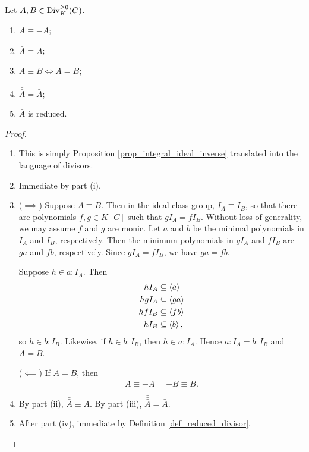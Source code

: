 \begin{proposition}
  \label{prop_flip_properties}
  Let $A, B \in \operatorname{Div}_K^{\geq 0}(C)$.
  \begin{enumerate}[label=(\roman*)]
    \item $\bar A \equiv -A$;
    \item $\bar{\bar A} \equiv A$;
    \item $A \equiv B \iff \bar A = \bar B$;
    \item $\bar{\bar{\bar A}} = \bar A$;
    \item $\bar A$ is reduced.
  \end{enumerate}
\end{proposition}
\begin{proof}
  \begin{enumerate}[label=(\roman*)]
    \item This is simply Proposition \ref{prop_integral_ideal_inverse} translated into the language of divisors.
    \item Immediate by part (i).
    \item
      ($\implies$)
      Suppose $A \equiv B$.
      Then in the ideal class group, $I_A \equiv I_B$,
      so that there are polynomials $f, g \in K[C]$ such that $gI_A = fI_B$.
      Without loss of generality, we may assume $f$ and $g$ are monic.
      Let $a$ and $b$ be the minimal polynomials in $I_A$ and $I_B$, respectively.
      Then the minimum polynomials in $gI_A$ and $fI_B$ are $ga$ and $fb$, respectively.
      Since $gI_A = fI_B$, we have $ga = fb$.
      
      Suppose $h \in a : I_A$. Then
      \begin{align*}
        hI_A &\subseteq \left\langle a \right\rangle \\
        hgI_A &\subseteq \left\langle ga \right\rangle \\
        hfI_B &\subseteq \left\langle fb \right\rangle \\
        hI_B &\subseteq \left\langle b \right\rangle,
      \end{align*}
      so $h \in b : I_B$.
      Likewise, if $h \in b : I_B$, then $h \in a : I_A$.
      Hence $a : I_A = b : I_B$ and $\bar A = \bar B$.
      
      ($\impliedby$)
      If $\bar A = \bar B$, then
      \[ A \equiv - \bar A = - \bar B \equiv B. \]
    \item By part (ii), $\bar{\bar A} \equiv A$.
          By part (iii), $\bar{\bar{\bar A}} = \bar A$.
    \item After part (iv), immediate by Definition \ref{def_reduced_divisor}.
  \end{enumerate}
\end{proof}

